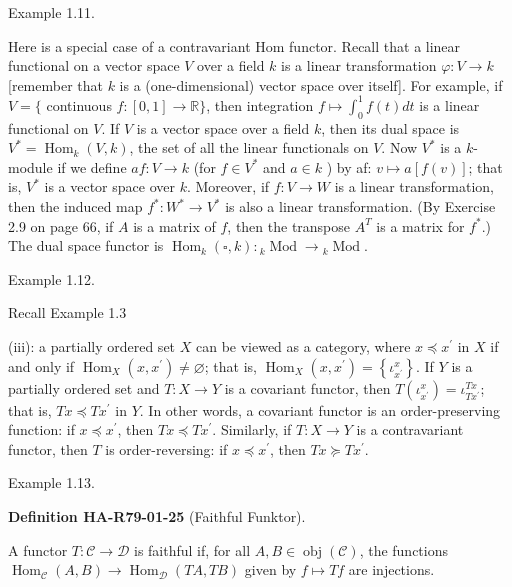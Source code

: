 \documentclass[10pt, letterpaper]{article}
\newcommand{\CustomHeading}[3]{%
  \par\medskip\noindent%
  \textbf{#1 #2} \textnormal{(#3)}.\enskip%
}
\newenvironment{DEF}[2]{\begin{unitbox}\CustomHeading{Definition}{#1}{#2}}{\end{unitbox}}
\begin{document}
Example 1.11. 


Here is a special case of a contravariant Hom functor. Recall that a linear functional on a vector space $V$ over a field $k$ is a linear transformation $\varphi: V \rightarrow k$ [remember that $k$ is a (one-dimensional) vector space over itself]. For example, if $V=\{$ continuous $f:[0,1] \rightarrow \mathbb{R}\}$, then integration $f \mapsto \int_{0}^{1} f(t) d t$ is a linear functional on $V$. If $V$ is a vector space over a field $k$, then its dual space is $V^{*}=\operatorname{Hom}_{k}(V, k)$, the set of all the linear functionals on $V$. Now $V^{*}$ is a $k$-module if we define $a f: V \rightarrow k$ (for $f \in V^{*}$ and $a \in k$ ) by af: $v \mapsto a[f(v)]$; that is, $V^{*}$ is a vector space over $k$. Moreover, if $f: V \rightarrow W$ is a linear transformation, then the induced map $f^{*}: W^{*} \rightarrow V^{*}$ is also a linear transformation. (By Exercise 2.9 on page 66, if $A$ is a matrix of $f$, then the transpose $A^{T}$ is a matrix for $f^{*}$.) The dual space functor is $\operatorname{Hom}_{k}(\square, k):{ }_{k} \operatorname{Mod} \rightarrow{ }_{k} \operatorname{Mod}$.


Example 1.12. 


Recall Example 1.3

(iii): a partially ordered set $X$ can be viewed as a category, where $x \preceq x^{\prime}$ in $X$ if and only if $\operatorname{Hom}_{X}\left(x, x^{\prime}\right) \neq \varnothing$; that is, $\operatorname{Hom}_{X}\left(x, x^{\prime}\right)=\left\{\iota_{x^{\prime}}^{x}\right\}$. If $Y$ is a partially ordered set and $T: X \rightarrow Y$ is a covariant functor, then $T\left(\iota_{x^{\prime}}^{x}\right)=\iota_{T x^{\prime}}^{T x}$; that is, $T x \preceq T x^{\prime}$ in $Y$. In other words, a covariant functor is an order-preserving function: if $x \preceq x^{\prime}$, then $T x \preceq T x^{\prime}$. Similarly, if $T: X \rightarrow Y$ is a contravariant functor, then $T$ is order-reversing: if $x \preceq x^{\prime}$, then $T x \succeq T x^{\prime}$.

Example 1.13. 

\begin{DEF}{HA-R79-01-25}{Faithful Funktor}
A functor $T: \mathcal{C} \rightarrow \mathcal{D}$ is faithful if, for all $A, B \in \operatorname{obj}(\mathcal{C})$, the functions $\operatorname{Hom}_{\mathcal{C}}(A, B) \rightarrow \operatorname{Hom}_{\mathcal{D}}(T A, T B)$ given by $f \mapsto T f$ are injections.
\end{DEF}
\end{document}
